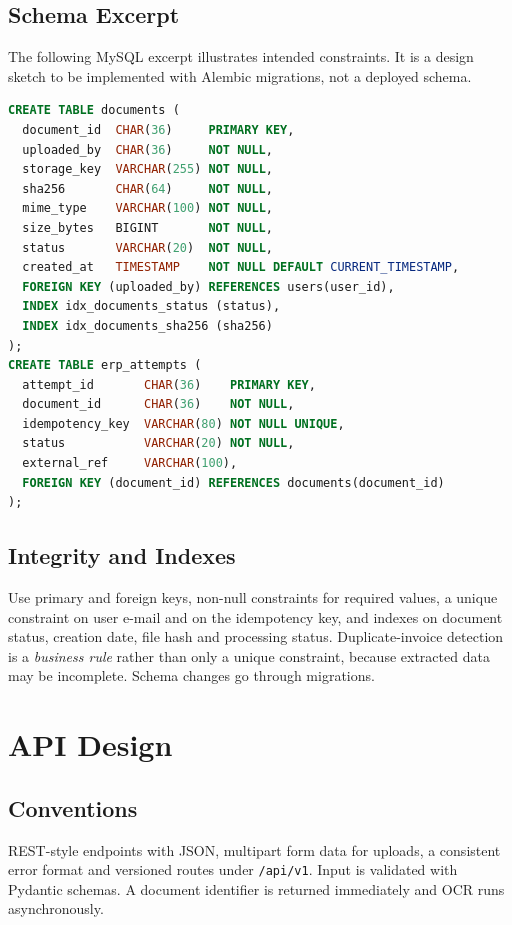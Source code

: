\section{Schema Excerpt}
The following MySQL excerpt illustrates intended constraints. It is a design sketch to be implemented with Alembic migrations, not a deployed schema.
\begin{lstlisting}[language=SQL]
CREATE TABLE documents (
  document_id  CHAR(36)     PRIMARY KEY,
  uploaded_by  CHAR(36)     NOT NULL,
  storage_key  VARCHAR(255) NOT NULL,
  sha256       CHAR(64)     NOT NULL,
  mime_type    VARCHAR(100) NOT NULL,
  size_bytes   BIGINT       NOT NULL,
  status       VARCHAR(20)  NOT NULL,
  created_at   TIMESTAMP    NOT NULL DEFAULT CURRENT_TIMESTAMP,
  FOREIGN KEY (uploaded_by) REFERENCES users(user_id),
  INDEX idx_documents_status (status),
  INDEX idx_documents_sha256 (sha256)
);
CREATE TABLE erp_attempts (
  attempt_id       CHAR(36)    PRIMARY KEY,
  document_id      CHAR(36)    NOT NULL,
  idempotency_key  VARCHAR(80) NOT NULL UNIQUE,
  status           VARCHAR(20) NOT NULL,
  external_ref     VARCHAR(100),
  FOREIGN KEY (document_id) REFERENCES documents(document_id)
);
\end{lstlisting}

\section{Integrity and Indexes}
Use primary and foreign keys, non-null constraints for required values, a unique constraint on user e-mail and on the idempotency key, and indexes on document status, creation date, file hash and processing status. Duplicate-invoice detection is a \emph{business rule} rather than only a unique constraint, because extracted data may be incomplete. Schema changes go through migrations.

\chapter{API Design}
\section{Conventions}
REST-style endpoints with JSON, multipart form data for uploads, a consistent error format and versioned routes under \texttt{/api/v1}. Input is validated with Pydantic schemas. A document identifier is returned immediately and OCR runs asynchronously.

